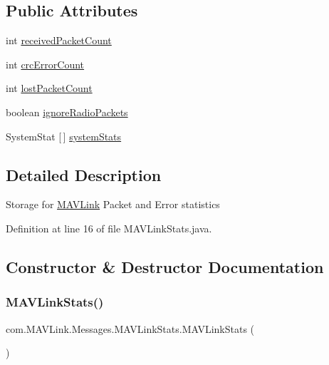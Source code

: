 \subsection*{Public Attributes}
\begin{DoxyCompactItemize}
\item 
int \mbox{\hyperlink{classcom_1_1MAVLink_1_1Messages_1_1MAVLinkStats_a019b6f44a6f08c0ed84d197ca08942a1}{received\+Packet\+Count}}
\item 
int \mbox{\hyperlink{classcom_1_1MAVLink_1_1Messages_1_1MAVLinkStats_ad1252f1b83af0035d0db52d2315c76c8}{crc\+Error\+Count}}
\item 
int \mbox{\hyperlink{classcom_1_1MAVLink_1_1Messages_1_1MAVLinkStats_a56bfffd01dd23f6a21b923eb3a1b8060}{lost\+Packet\+Count}}
\item 
boolean \mbox{\hyperlink{classcom_1_1MAVLink_1_1Messages_1_1MAVLinkStats_a1dde02cba4a77df273af88534f38e29a}{ignore\+Radio\+Packets}}
\item 
System\+Stat \mbox{[}$\,$\mbox{]} \mbox{\hyperlink{classcom_1_1MAVLink_1_1Messages_1_1MAVLinkStats_af5f6d4b3c54f7c68b928c3bfd3286452}{system\+Stats}}
\end{DoxyCompactItemize}


\subsection{Detailed Description}
Storage for \mbox{\hyperlink{namespacecom_1_1MAVLink}{M\+A\+V\+Link}} Packet and Error statistics 

Definition at line 16 of file M\+A\+V\+Link\+Stats.\+java.



\subsection{Constructor \& Destructor Documentation}
\mbox{\label{classcom_1_1MAVLink_1_1Messages_1_1MAVLinkStats_a3bce8a63c9eaacba068bd0bc559ec9ea}} 
\subsubsection{\texorpdfstring{MAVLinkStats()}{MAVLinkStats()}\hspace{0.1cm}{\footnotesize\ttfamily [1/2]}}
{\footnotesize\ttfamily com.\+M\+A\+V\+Link.\+Messages.\+M\+A\+V\+Link\+Stats.\+M\+A\+V\+Link\+Stats (\begin{DoxyParamCaption}{ }\end{DoxyParamCaption})\hspace{0.3cm}{\ttfamily [inline]}}



